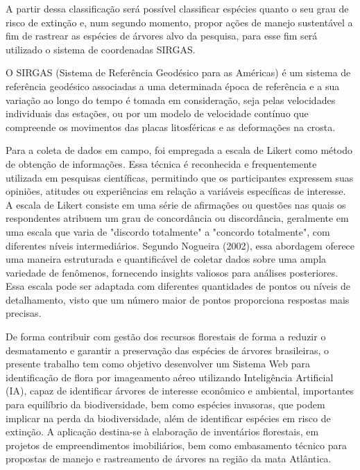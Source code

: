 A partir dessa classificação será possível classificar espécies quanto o seu grau de risco de extinção e, num segundo momento, propor ações de manejo sustentável a fim de rastrear as espécies de árvores alvo da pesquisa, para esse fim será utilizado o sistema de coordenadas SIRGAS.\par

O SIRGAS (Sistema de Referência Geodésico para as Américas) é um sistema de referência geodésico associadas a uma determinada época de referência e a sua variação ao longo do tempo é tomada em consideração, seja pelas velocidades individuais das estações, ou por um modelo de velocidade contínuo que compreende os movimentos das placas litosféricas e as deformações na crosta. \cite{SIRGAS2023}

Para a coleta de dados em campo, foi empregada a escala de Likert como método de obtenção de informações. Essa técnica é reconhecida e frequentemente utilizada em pesquisas científicas, permitindo que os participantes expressem suas opiniões, atitudes ou experiências em relação a variáveis específicas de interesse. A escala de Likert consiste em uma série de afirmações ou questões nas quais os respondentes atribuem um grau de concordância ou discordância, geralmente em uma escala que varia de "discordo totalmente" a "concordo totalmente", com diferentes níveis intermediários.  Segundo Nogueira (2002), essa abordagem oferece uma maneira estruturada e quantificável de coletar dados sobre uma ampla variedade de fenômenos, fornecendo insights valiosos para análises posteriores. Essa escala pode ser adaptada com diferentes quantidades de pontos ou níveis de detalhamento, visto que um número maior de pontos proporciona respostas mais precisas.

De forma  contribuir com gestão dos recursos florestais de forma a reduzir o desmatamento e garantir a preservação das espécies de árvores brasileiras, o presente trabalho tem como objetivo desenvolver um Sistema Web para identificação de flora por imageamento aéreo utilizando Inteligência Artificial (IA), capaz de identificar árvores de interesse econômico e ambiental, importantes para equilíbrio da biodiversidade, bem como espécies invasoras, que podem implicar na perda da biodiversidade, além de identificar espécies em risco de extinção. A aplicação destina-se à elaboração de inventários florestais, em projetos de empreendimentos imobiliários, bem como embasamento técnico para propostas de manejo e rastreamento de árvores na região da mata Atlântica.